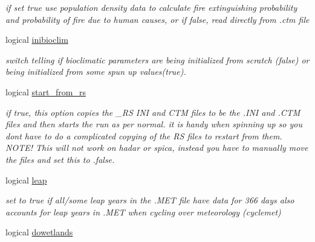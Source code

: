\begin{DoxyCompactItemize}
\begin{DoxyCompactList}\small\item\em if set true use population density data to calculate fire extinguishing probability and probability of fire due to human causes, or if false, read directly from .ctm file \end{DoxyCompactList}\item 
\hypertarget{structctem__statevars_1_1ctem__switches_a363efc622307abfadb56494f98bf4b35}{}logical \hyperlink{structctem__statevars_1_1ctem__switches_a363efc622307abfadb56494f98bf4b35}{inibioclim}\label{structctem__statevars_1_1ctem__switches_a363efc622307abfadb56494f98bf4b35}

\begin{DoxyCompactList}\small\item\em switch telling if bioclimatic parameters are being initialized from scratch (false) or being initialized from some spun up values(true). \end{DoxyCompactList}\item 
\hypertarget{structctem__statevars_1_1ctem__switches_aacd9aa69804fc52f340ea0652d410f9d}{}logical \hyperlink{structctem__statevars_1_1ctem__switches_aacd9aa69804fc52f340ea0652d410f9d}{start\+\_\+from\+\_\+rs}\label{structctem__statevars_1_1ctem__switches_aacd9aa69804fc52f340ea0652d410f9d}

\begin{DoxyCompactList}\small\item\em if true, this option copies the \+\_\+\+R\+S I\+N\+I and C\+T\+M files to be the .I\+N\+I and .C\+T\+M files and then starts the run as per normal. it is handy when spinning up so you don\textquotesingle{}t have to do a complicated copying of the R\+S files to restart from them. N\+O\+T\+E! This will not work on hadar or spica, instead you have to manually move the files and set this to .false. \end{DoxyCompactList}\item 
\hypertarget{structctem__statevars_1_1ctem__switches_a0d2cee5988b9acc49829041803774a2d}{}logical \hyperlink{structctem__statevars_1_1ctem__switches_a0d2cee5988b9acc49829041803774a2d}{leap}\label{structctem__statevars_1_1ctem__switches_a0d2cee5988b9acc49829041803774a2d}

\begin{DoxyCompactList}\small\item\em set to true if all/some leap years in the .M\+E\+T file have data for 366 days also accounts for leap years in .M\+E\+T when cycling over meteorology (cyclemet) \end{DoxyCompactList}\item 
\hypertarget{structctem__statevars_1_1ctem__switches_a8784d0eb86363cf7060f8f0e5a882558}{}logical \hyperlink{structctem__statevars_1_1ctem__switches_a8784d0eb86363cf7060f8f0e5a882558}{dowetlands}\label{structctem__statevars_1_1ctem__switches_a8784d0eb86363cf7060f8f0e5a882558}


\end{DoxyCompactItemize}

